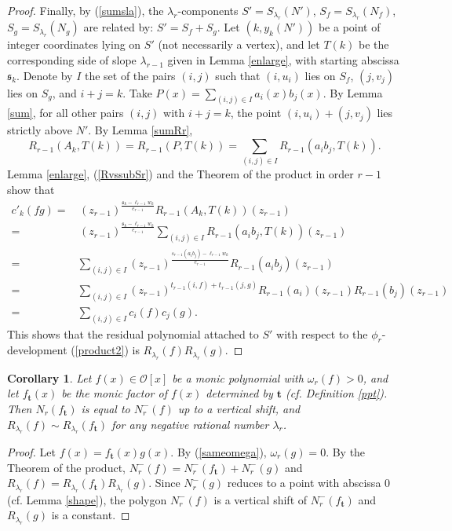 \documentclass{amsart}
\newtheorem{corollary}[theorem]{Corollary}
\def\la{\lambda}
\def\om{\omega}
\def\oo{{\mathcal O}}
\def\ty{\mathbf{t}}
\def\zpx{\oo[x]}
\begin{document}
\begin{proof}
Finally, by (\ref{sumsla}), the $\la_r$-components $S'=S_{\la_r}(N')$, $S_f=S_{\la_r}(N_f)$, $S_g=S_{\la_r}(N_g)$ are related by: $S'=S_f+S_g$. Let $(k,y_k(N'))$ be a point of integer coordinates lying on $S'$ (not necessarily a vertex), and let $T(k)$ be the corresponding side of slope $\la_{r-1}$ given in Lemma \ref{enlarge}, with starting abscissa $\mathfrak{s}_k$. Denote by $I$ the set of the pairs $(i,j)$ such that $(i,u_i)$ lies on $S_f$, $(j,v_j)$ lies on $S_g$, and $i+j=k$. Take $P(x)=\sum_{(i,j)\in I}a_i(x)b_j(x)$. By Lemma \ref{sum}, for all other pairs $(i,j)$ with $i+j=k$, the point $(i,u_i)+(j,v_j)$ lies strictly above $N'$. 
By Lemma \ref{sumRr},  
$$R_{r-1}(A_k,T(k))=R_{r-1}(P,T(k))=\sum_{(i,j)\in I}R_{r-1}(a_ib_j,T(k)).$$ Lemma \ref{enlarge}, (\ref{RvssubSr}) and the Theorem of the product in order $r-1$ show that
\begin{align*}
c'_k(fg)=&\,(z_{r-1})^{\frac{\mathfrak{s}_k-\ell_{r-1} w_k}{e_{r-1}}}R_{r-1}(A_k,T(k))(z_{r-1})\\=&\,(z_{r-1})^{\frac{\mathfrak{s}_k-\ell_{r-1} w_k}{e_{r-1}}}\sum_{(i,j)\in I}R_{r-1}(a_ib_j,T(k))(z_{r-1})\\
=&\sum_{(i,j)\in I}(z_{r-1})^{\frac{s_{r-1}(a_ib_j)-\ell_{r-1} w_k}{e_{r-1}}}R_{r-1}(a_ib_j)(z_{r-1})\\=&\sum_{(i,j)\in I}(z_{r-1})^{t_{r-1}(i,f)+t_{r-1}(j,g)}R_{r-1}(a_i)(z_{r-1})R_{r-1}(b_j)(z_{r-1})\\
=&\sum_{(i,j)\in I}c_i(f)c_j(g).
\end{align*}
This shows that the residual polynomial attached to $S'$ with respect to the $\phi_r$-development (\ref{product2}) is $R_{\la_r}(f)R_{\la_r}(g)$.
\end{proof}

\begin{corollary}\label{vshift}
Let $f(x)\in \zpx$ be a monic polynomial with $\om_r(f)>0$, and let $f_{\ty}(x)$ be the monic factor of $f(x)$ determined by $\ty$ (cf. Definition \ref{ppt}). Then $N_r(f_{\ty})$ is equal to $N_r^-(f)$ up to a vertical shift, and $R_{\la_r}(f)\sim R_{\la_r}(f_\ty)$ for any negative rational number $\la_r$. 
\end{corollary}

\begin{proof}
Let $f(x)=f_{\ty}(x)g(x)$. By (\ref{sameomega}), $\om_r(g)=0$. By the Theorem of the product, $N_r^-(f)=N_r^-(f_{\ty})+N_r^-(g)$ and $R_{\la_r}(f)=R_{\la_r}(f_\ty)R_{\la_r}(g)$. Since  
$N_r^-(g)$ reduces to a point with abscissa $0$ (cf. Lemma \ref{shape}), the polygon $N_r^-(f)$ is a vertical shift of $N_r^-(f_{\ty})$ and $R_{\la_r}(g)$ is a cons\-tant.
\end{proof}
\end{document}
